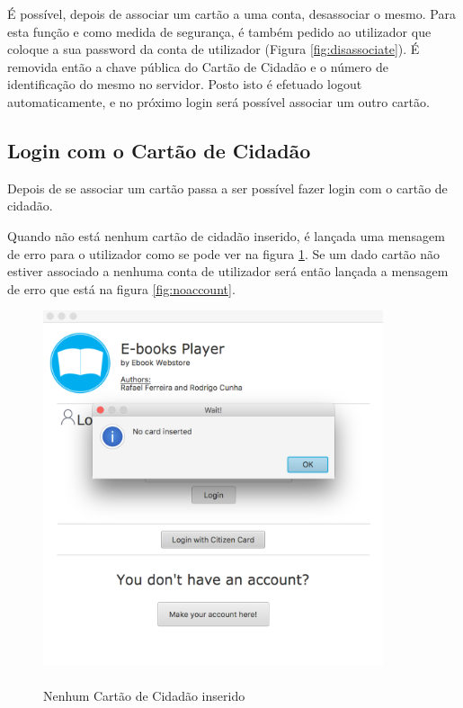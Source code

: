 \documentclass[pdftex,12pt,a4paper]{report}
\begin{document}
É possível, depois de associar um cartão a uma conta, desassociar o mesmo. Para esta função e como medida de segurança, é também pedido ao utilizador que coloque a sua password da conta de utilizador (Figura \ref{fig:disassociate}). É removida então a chave pública do Cartão de Cidadão e o número de identificação do mesmo no servidor. Posto isto é efetuado logout automaticamente, e no próximo login será possível associar um outro cartão.
\newpage
\subsection{Login com o Cartão de Cidadão}

Depois de se associar um cartão passa a ser possível fazer login com o cartão de cidadão. 

Quando não está nenhum cartão de cidadão inserido, é lançada uma mensagem de erro para o utilizador como se pode ver na figura \ref{fig:nocard}. Se um dado cartão não estiver associado a nenhuma conta de utilizador será então lançada a mensagem de erro que está na figura \ref{fig:noaccount}.

\begin{figure}[!htb]
\center
 \includegraphics[width=100mm,scale=1]{Nocard.png}
 \caption{\\Nenhum Cartão de Cidadão inserido}
 \label{fig:nocard}
\end{figure}
\end{document}
